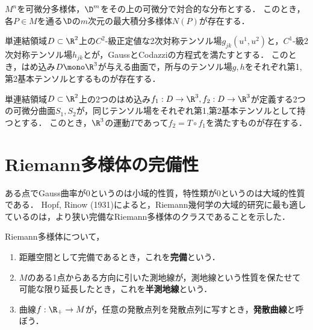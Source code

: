 \documentclass[uplatex,dvipdfmx]{jsreport}
\begin{document}
\begin{lemma}[Frobenius]
    $M^n$を可微分多様体，$\D^m$をその上の可微分で対合的な分布とする．
    このとき，各$P\in M$を通る$\D$の$m$次元の最大積分多様体$N(P)$が存在する．
\end{lemma}

\begin{theorem}
    単連結領域$D\subset\R^2$上の$C^2$-級正定値な2次対称テンソル場$g_{jk}(u^1,u^2)$と，$C^1$-級2次対称テンソル場$h_{jk}$とが，GaussとCodazziの方程式を満たすとする．
    このとき，はめ込み$D\mono\R^3$が与える曲面で，所与のテンソル場$g,h$をそれぞれ第1,第2基本テンソルとするものが存在する．
\end{theorem}

\begin{theorem}
    単連結領域$D\subset\R^2$上の2つのはめ込み$f_1:D\to\R^3,f_2:D\to\R^3$が定義する2つの可微分曲面$S_1,S_2$が，同じテンソル場をそれぞれ第1,第2基本テンソルとして持つとする．
    このとき，$\R^3$の運動$T$であって$f_2=T\circ f_1$を満たすものが存在する．
\end{theorem}

\section{Riemann多様体の完備性}

\begin{tcolorbox}[colframe=ForestGreen, colback=ForestGreen!10!white,breakable,colbacktitle=ForestGreen!40!white,coltitle=black,fonttitle=\bfseries\sffamily,
title=]
    ある点でGauss曲率が$0$というのは小域的性質，特性類が$0$というのは大域的性質である．
    Hopf, Rinow (1931)によると，Riemann幾何学の大域的研究に最も適しているのは，より狭い完備なRiemann多様体のクラスであることを示した．
\end{tcolorbox}

\begin{definition}
    Riemann多様体について，
    \begin{enumerate}
        \item 距離空間として完備であるとき，これを\textbf{完備}という．
        \item $M$のある1点からある方向に引いた測地線が，測地線という性質を保たせて可能な限り延長したとき，これを\textbf{半測地線}という．
        \item 曲線$f:\R_+\to M$が，任意の発散点列を発散点列に写すとき，\textbf{発散曲線}と呼ぼう．
    \end{enumerate}
\end{definition}
\end{document}
